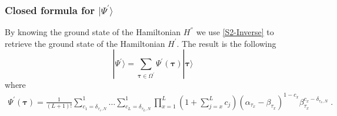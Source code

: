 \documentclass[10pt]{article}
\numberwithin{equation}{section}
\numberwithin{equation}{subsection}
\newcommand{\dt}{\;.}
\begin{document}
\subsubsection{Closed formula for $|\Psi^{'}\rangle$}\label{subsectionSSdual}
By knowing the ground state  of the Hamiltonian $H^{''}$ we use \eqref{S2-Inverse} to retrieve the ground state of the Hamiltonian $H^{'}$. The result is the following 
\begin{equation}\label{ABS-vect}
    |\Psi^{'}\rangle =\sum_{\bm{\tau}\in \Omega^{'}}\Psi^{'}(\bm{\tau})|\bm{\tau}\rangle 
\end{equation}
where  
\begin{equation}\label{ABS}
		\begin{split}
			\Psi^{'}(\bm{\tau})=\frac{1}{(L+1)!}\sum_{c_{1}=\delta_{\tau_{1},N}}^{1}\ldots\sum_{c_{L}=\delta_{\tau_{L},N}}^{1}\prod_{x=1}^{L}\left(1+\sum_{j=x}^{L}c_{j}\right)(\alpha_{\tau_{x}}-\beta_{\tau_{x}})^{1-c_{x}}\beta_{\tau_{x}}^{c_{x}-\delta_{\tau_{x},N}}\dt
		\end{split}
	\end{equation} 
\end{document}
